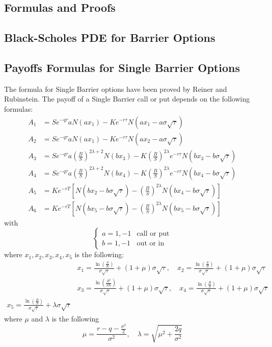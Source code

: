 \begin{appendices}
\chapter{Formulas and Proofs}
\section{Black-Scholes PDE for Barrier Options}
\label{section:A1}
\newpage
\section{Payoffs Formulas for Single Barrier Options}
\label{section:A2}
The formula for Single Barrier options have been proved by Reiner and Rubinstein. The payoff of a Single Barrier call or put depends on the following formulas:
\[
\begin{aligned}
	A_1&=Se^{-q\tau}aN(ax_1)-Ke^{-r\tau}N(ax_1-a\sigma\sqrt{\tau})\\
	A_2&=Se^{-q\tau}aN(ax_1)-Ke^{-r\tau}N(ax_2-a\sigma\sqrt{\tau})\\
	A_3&=Se^{-q\tau}a\left(\tfrac{B}{S}\right)^{2\lambda+2}N(bx_3)-K\left(\tfrac{B}{S}\right)^{2\lambda}e^{-r\tau}N(bx_3-b\sigma\sqrt{\tau})\\
	A_4&=Se^{-q\tau}a\left(\tfrac{B}{S}\right)^{2\lambda+2}N(bx_4)-K\left(\tfrac{B}{S}\right)^{2\lambda}e^{-r\tau}N(bx_4-b\sigma\sqrt{\tau})\\
	A_5&=Ke^{-rT}\left[N(bx_2-b\sigma\sqrt{\tau})-\left(\tfrac{B}{S}\right)^{2\lambda}N\left(bx_4-b\sigma\sqrt{\tau}\right)\right]\\
	A_6&=Ke^{-rT}\left[N(bx_5-b\sigma\sqrt{\tau})-\left(\tfrac{B}{S}\right)^{2\lambda}N\left(bx_5-b\sigma\sqrt{\tau}\right)\right]
\end{aligned}
\]
with
\[
\begin{cases}
	a=1,-1&\text{call or put}\\
	b=1,-1&\text{out or in}
\end{cases}
\]
where $x_1,x_2,x_3,x_4,x_5$ is the following:
\[
\begin{aligned}
	&x_1=\frac{\ln\left(\frac{S}{K}\right)}{\sigma\sqrt{\tau}}+(1+\mu)\sigma\sqrt{\tau},\quad x_2=\frac{\ln\left(\frac{S}{B}\right)}{\sigma\sqrt{\tau}}+(1+\mu)\sigma\sqrt{\tau}\\
	&x_3=\frac{\ln\left(\frac{B^2}{SK}\right)}{\sigma\sqrt{\tau}}+(1+\mu)\sigma\sqrt{\tau},\quad x_4=\frac{\ln\left(\frac{B}{S}\right)}{\sigma\sqrt{\tau}}+(1+\mu)\sigma\sqrt{\tau}\\
	x_5=\frac{\ln\left(\frac{B}{S}\right)}{\sigma\sqrt{\tau}}+\lambda\sigma\sqrt{\tau}
\end{aligned}
\]
where $\mu$ and $\lambda$ is the following
\[
\mu=\frac{r-q-\tfrac{\sigma^2}{2}}{\sigma^2},\quad\lambda=\sqrt{\mu^2+\frac{2q}{\sigma^2}}
\]
\end{appendices}
